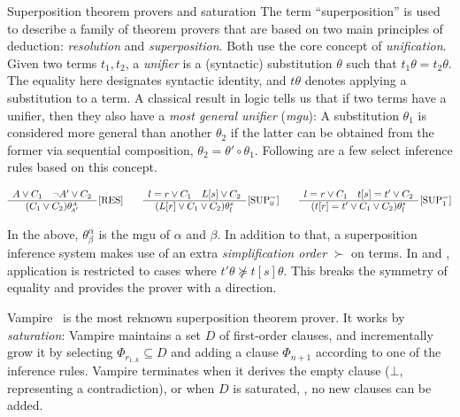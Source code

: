 \begin{paragraph}{Superposition theorem provers and saturation}
The term ``superposition'' is used to describe a family of theorem provers that are based on two main principles of deduction: \emph{resolution} and \emph{superposition}.
Both use the core concept of \emph{unification}.
Given two terms $t_1, t_2$, a \emph{unifier} is a (syntactic) substitution $\theta$ such that $t_1\theta = t_2\theta$.
The equality here designates syntactic identity, and $t\theta$ denotes applying a substitution to a term.
A classical result in logic tells us that if two terms have a unifier, then they also have a \emph{most general unifier} (\emph{mgu}):
A substitution $\theta_1$ is considered more general than another $\theta_2$ if the latter can be obtained from the former via sequential composition, $\theta_2 = \theta'\circ\theta_1$.
Following are a few select inference rules based on this concept.

\noindent\vspace{0pt}
\[
\begin{array}{c}
A \lor C_1 \quad \lnot A' \lor C_2 \\ \hline
(C_1 \lor C_2)\theta^{\scriptscriptstyle A}_{\scriptscriptstyle \!A'}
\end{array}
\,\textrm{[RES]}
\qquad
\begin{array}{c}
l=r \lor C_1 \quad L[s] \lor C_2 \\ \hline
(L[r] \lor C_1 \lor C_2)\theta^{s}_{l}
\end{array}
\,\textrm{[SUP$^=_0$]}
\qquad
\begin{array}{c}
l=r \lor C_1 \quad t[s]=t' \lor C_2 \\ \hline
(t[r]=t' \lor C_1 \lor C_2)\theta^{s}_{l}
\end{array}
\,\textrm{[SUP$^=_1$]}
\]

In the above, $\theta^{\alpha}_{\!\beta}$ is the mgu of $\alpha$ and $\beta$.
In addition to that, a superposition inference system makes use of an extra \emph{simplification order} $\succ$ on terms.
In  and ,
application is restricted to cases where
$t'\theta \not\succeq t[s]\theta$.
This breaks the symmetry of equality and provides the prover with a direction.

Vampire~\cite{JAR1995:Voronkov,CAV2013:Kovacs} is the most reknown superposition theorem prover.
It works by \emph{saturation}: Vampire maintains a set $D$ of first-order clauses,
and incrementally grow it by selecting $\Phi_{r_{1..k}} \subseteq D$ and adding a clause $\Phi_{n+1}$ according to one of the inference rules.
Vampire terminates when it derives the empty clause ($\bot$, representing a contradiction),
or when $D$ is saturated, \ie, no new clauses can be added.
\end{paragraph}

